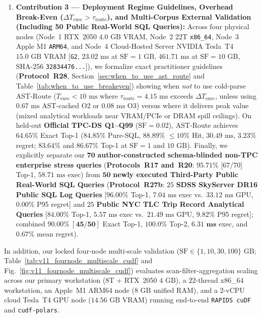 \documentclass[10pt,a4paper]{article}
\begin{document}
\begin{enumerate}[leftmargin=1.5em,itemsep=1.5pt]
    \item \textbf{Contribution 3 --- Deployment Regime Guidelines, Overhead Break-Even ($\Delta T_{\text{exec}} > \tau_{\text{route}}$), and Multi-Corpus External Validation (Including 50 Public Real-World SQL Queries):} Across four physical nodes (Node~1 RTX~2050 $4.0\text{ GB}$ VRAM, Node~2 22T \texttt{x86\_64}, Node~3 Apple M1 \texttt{ARM64}, and Node~4 Cloud-Hosted Server NVIDIA Tesla~T4 $15.0\text{ GB}$ VRAM [\texttt{G2}, $23.02\text{ ms}$ at $\text{SF}=1\text{ GB}$, $461.71\text{ ms}$ at $\text{SF}=10\text{ GB}$, SHA-256 \texttt{32834476...}]), we formalize exact practitioner guidelines (\textbf{Protocol~R28}, Section~\ref{sec:when_to_use_ast_route} and Table~\ref{tab:when_to_use_breakeven}) showing when \emph{not} to use cold-parse AST-Route ($T_{\text{exec}}<10\text{ ms}$ where $\tau_{\text{route}}=4.15\text{ ms}$ exceeds $\Delta T_{\text{exec}}$, unless using $0.67\text{ ms}$ AST-cached O2 or $0.08\text{ ms}$ O3) versus where it delivers peak value (mixed analytical workloads near VRAM/PCIe or DRAM spill ceilings). On held-out \textbf{Official TPC-DS Q1--Q99} ($\text{SF}=0.02$), AST-Route achieves $\mathbf{64.65\%}$ Exact Top-1 ($\mathbf{84.85\%}$ Pure-SQL, $\mathbf{88.89\%}$ $\le 10\%$ Hit, $30.49\text{ ms}$, $3.23\%$ regret; $83.64\%$ and $86.67\%$ Top-1 at $\text{SF}=1$ and $10\text{ GB}$). Finally, we explicitly separate our $\mathbf{70}$ \textbf{author-constructed schema-blinded non-TPC enterprise stress queries} (\textbf{Protocols~R17 and~R20}: $95.71\%$ [$67/70$] Top-1, $58.71\text{ ms}$ exec) from $\mathbf{50}$ \textbf{newly executed Third-Party Public Real-World SQL Queries} (\textbf{Protocol~R27b}: $25$ \textbf{SDSS SkyServer DR16 Public SQL Log Queries} [$\mathbf{96.00\%}$ Top-1, $7.04\text{ ms}$ exec vs.\ $33.12\text{ ms}$ GPU, $\mathbf{0.00\%}$ P95 regret] and $25$ \textbf{Public NYC TLC Trip Record Analytical Queries} [$\mathbf{84.00\%}$ Top-1, $5.57\text{ ms}$ exec vs.\ $21.49\text{ ms}$ GPU, $\mathbf{9.82\%}$ P95 regret]; combined $\mathbf{90.00\%\ [45/50]}$ Exact Top-1, $\mathbf{100.0\%}$ Top-2, $\mathbf{6.31\text{ ms}}$ exec, and $\mathbf{0.67\%}$ mean regret).
\end{enumerate}

\label{tab:key_findings_glance}\label{tab:jbd_glance_1a}%

In addition, our locked four-node multi-scale validation ($\text{SF}\in\{1,10,30,100\}\text{ GB}$; Table~\ref{tab:v11_fournode_multiscale_cudf} and Fig.~\ref{fig:v11_fournode_multiscale_cudf}) evaluates scan-filter-aggregation scaling across our primary workstation (8T + RTX~2050 $4\text{ GB}$), a $22$-thread x86\_64 workstation, an Apple~M1 ARM64 node ($8\text{ GB}$ unified RAM), and a 2-vCPU cloud Tesla~T4 GPU node ($14.56\text{ GB}$ VRAM) running end-to-end \texttt{RAPIDS cuDF}~\cite{rapids2024cudf} and \texttt{cudf-polars}.
\end{document}
